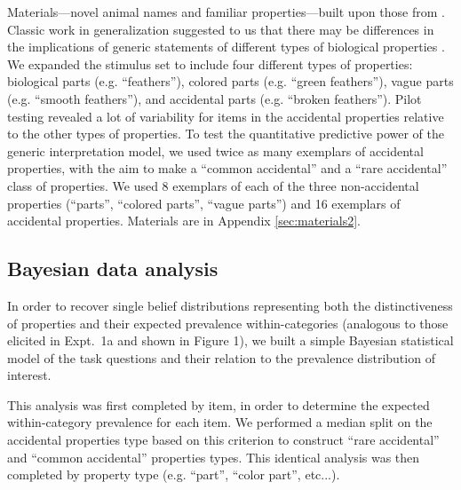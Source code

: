 \documentclass[10pt,letterpaper]{article}
\begin{document}
Materials---novel animal names and familiar properties---built upon those from . 
Classic work in generalization suggested to us that there may be differences in the implications of generic statements of different types of biological properties \cite{Nisbett1983}. 
We expanded the stimulus set to include four different types of properties: biological parts (e.g. ``feathers''), colored parts (e.g. ``green feathers''), vague parts (e.g. ``smooth feathers''), and accidental parts (e.g. ``broken feathers''). 
Pilot testing revealed a lot of variability for items in the accidental properties relative to the other types of properties. 
To test the quantitative predictive power of the generic interpretation model, we used twice as many exemplars of accidental properties, with the aim to make a ``common accidental'' and a ``rare accidental'' class of properties. 
We used 8 exemplars of each of the three non-accidental properties (``parts'', ``colored parts'', ``vague parts'') and 16 exemplars of accidental properties.
Materials are in Appendix \ref{sec:materials2}.

\subsection{Bayesian data analysis}
\label{sec:bda2}

In order to recover single belief distributions representing both the distinctiveness of properties and their expected prevalence within-categories (analogous to those elicited in Expt.~1a and shown in Figure 1), we built a simple Bayesian statistical model of the task questions and their relation to the prevalence distribution of interest. 

This analysis was first completed by item, in order to determine the expected within-category prevalence for each item. 
We performed a median split on the accidental properties type based on this criterion to construct ``rare accidental'' and ``common accidental'' properties types. 
This identical analysis was then completed by property type (e.g. ``part'', ``color part'', etc...).
\end{document}
